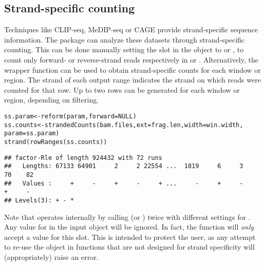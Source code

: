 \documentclass{report}\usepackage[]{graphicx}\usepackage[usenames,dvipsnames]{color}
\newcommand{\hlstd}[1]{\textcolor[rgb]{0.251,0.251,0.251}{#1}}%
\newcommand{\hlkwa}[1]{\textcolor[rgb]{0.125,0.125,0.941}{#1}}%
\newcommand{\hlkwb}[1]{\textcolor[rgb]{0,0,0}{#1}}%
\newcommand{\hlkwc}[1]{\textcolor[rgb]{0.251,0.251,0.251}{#1}}%
\newcommand{\hlkwd}[1]{\textcolor[rgb]{0.878,0.439,0.125}{#1}}%
\newenvironment{knitrout}{}{} %
\begin{document}
\subsection{Strand-specific counting}
Techniques like CLIP-seq, MeDIP-seq or CAGE provide strand-specific sequence information.
The  package can analyze these datasets through strand-specific counting.
This can be done manually setting the  slot in the  object to  or , to count only forward- or reverse-strand reads respectively in  or .
Alternatively, the  wrapper function can be used to obtain strand-specific counts for each window or region.
The strand of each output range indicates the strand on which reads were counted for that row.
Up to two rows can be generated for each window or region, depending on filtering.

\begin{knitrout}
\color{fgcolor}\begin{kframe}
\begin{alltt}
\hlstd{ss.param} \hlkwb{<-} \hlkwd{reform}\hlstd{(param,} \hlkwc{forward}\hlstd{=}\hlkwa{NULL}\hlstd{)}
\hlstd{ss.counts} \hlkwb{<-} \hlkwd{strandedCounts}\hlstd{(bam.files,} \hlkwc{ext}\hlstd{=frag.len,} \hlkwc{width}\hlstd{=win.width,}
                            \hlkwc{param}\hlstd{=ss.param)}
\hlkwd{strand}\hlstd{(}\hlkwd{rowRanges}\hlstd{(ss.counts))}
\end{alltt}
\begin{verbatim}
## factor-Rle of length 924432 with 72 runs
##   Lengths: 67133 64901     2     2 22554 ...  1819     6     3    70    82
##   Values :     +     -     +     -     + ...     -     +     -     +     -
## Levels(3): + - *
\end{verbatim}
\end{kframe}
\end{knitrout}

Note that  operates internally by calling  (or ) twice with different settings for . 
Any value for  in the input  object will be ignored.
In fact, the function will \textit{only} accept a  value for this slot.
This is intended to protect the user, as any attempt to re-use the  object in functions that are not designed for strand specificity will (appropriately) raise an error.
\end{document}
